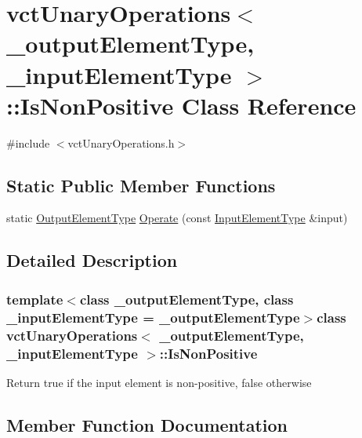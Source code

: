 \hypertarget{classvct_unary_operations_1_1_is_non_positive}{}\section{vct\+Unary\+Operations$<$ \+\_\+output\+Element\+Type, \+\_\+input\+Element\+Type $>$\+:\+:Is\+Non\+Positive Class Reference}
\label{classvct_unary_operations_1_1_is_non_positive}


{\ttfamily \#include $<$vct\+Unary\+Operations.\+h$>$}

\subsection*{Static Public Member Functions}
\begin{DoxyCompactItemize}
\item 
static \hyperlink{classvct_unary_operations_a42306ac3dd20d32c6d6c66ac3fa2e7b9}{Output\+Element\+Type} \hyperlink{classvct_unary_operations_1_1_is_non_positive_a2018c37d4dd46c8729593cbf717b225a}{Operate} (const \hyperlink{classvct_unary_operations_abf3b77bb7b8abd7ba72a6a45a65696a7}{Input\+Element\+Type} \&input)
\end{DoxyCompactItemize}


\subsection{Detailed Description}
\subsubsection*{template$<$class \+\_\+output\+Element\+Type, class \+\_\+input\+Element\+Type = \+\_\+output\+Element\+Type$>$class vct\+Unary\+Operations$<$ \+\_\+output\+Element\+Type, \+\_\+input\+Element\+Type $>$\+::\+Is\+Non\+Positive}

Return true if the input element is non-\/positive, false otherwise 

\subsection{Member Function Documentation}
\hypertarget{classvct_unary_operations_1_1_is_non_positive_a2018c37d4dd46c8729593cbf717b225a}{}
